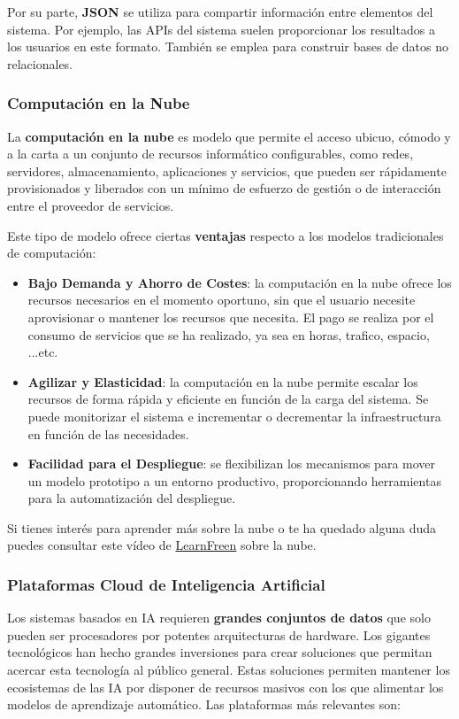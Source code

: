 Por su parte, \textbf{JSON} se utiliza para compartir información entre elementos del sistema. Por ejemplo, las APIs del sistema suelen proporcionar los resultados a los usuarios en este formato. También se emplea para construir bases de datos no relacionales.

\subsubsection{Computación en la Nube}
La \textbf{computación en la nube} es modelo que permite el acceso ubicuo, cómodo y a la carta a un conjunto de recursos informático configurables, como redes, servidores, almacenamiento, aplicaciones y servicios, que pueden ser rápidamente provisionados y liberados con un mínimo de esfuerzo de gestión o de interacción entre el proveedor de servicios.

Este tipo de modelo ofrece ciertas \textbf{ventajas} respecto a los modelos tradicionales de computación:

\begin{itemize}
	\item \textbf{Bajo Demanda y Ahorro de Costes}: la computación en la nube ofrece los recursos necesarios en el momento oportuno, sin que el usuario necesite aprovisionar o mantener los recursos que necesita. El pago se realiza por el consumo de servicios que se ha realizado, ya sea en horas, trafico, espacio, ...etc.
	\item \textbf{Agilizar y Elasticidad}: la computación en la nube permite escalar los recursos de forma rápida y eficiente en función de la carga del sistema. Se puede monitorizar el sistema e incrementar o decrementar la infraestructura en función de las necesidades.
	\item \textbf{Facilidad para el Despliegue}: se flexibilizan los mecanismos para mover un modelo prototipo a un entorno productivo, proporcionando herramientas para la automatización del despliegue.
\end{itemize}

Si tienes interés para aprender más sobre la nube o te ha quedado alguna duda puedes consultar este vídeo de \href{https://www.youtube.com/watch?v=xT75e-G1eak\&time\_continue=0\&source\_ve\_path=NzY3NTg\&embeds\_referring\_euri=https\%3A\%2F\%2Feducacionadistancia.juntadeandalucia.es\%2F}{LearnFreen} sobre la nube.

\subsubsection{Plataformas Cloud de Inteligencia Artificial}
Los sistemas basados en IA requieren \textbf{grandes conjuntos de datos} que solo pueden ser procesadores por potentes arquitecturas de hardware. Los gigantes tecnológicos han hecho grandes inversiones para crear soluciones que permitan acercar esta tecnología al público general. Estas soluciones permiten mantener los ecosistemas de las IA por disponer de recursos masivos con los que alimentar los modelos de aprendizaje automático. Las plataformas más relevantes son: 

